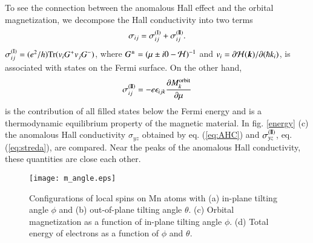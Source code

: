 \documentclass[letter,twocolumn,amsmath,amssymb,superscriptaddress]{jpsj3}
\newcommand{\vM}{\bm{M}}
\newcommand{\vk}{\bm{k}}
\begin{document}
To see the connection between the anomalous Hall effect and the orbital magnetization,
we decompose the Hall conductivity into two terms\cite{Streda1982}
\begin{equation}
\sigma_{ij}=
 \sigma_{ij}^{\rm (I)} + \sigma_{ij}^{\rm (I\!I)}.
\label{eq:I+II}
\end{equation}
$\sigma_{ij}^{\rm (I)}=(e^2/h){\rm Tr}(v_iG^+v_jG^-)$, 
where $G^{\pm}=(\mu \pm i0-{\cal H})^{-1}$ and $v_i=\partial{\cal H}(\vk)/\partial(\hbar k_i)$, 
is associated with states on the Fermi surface.\cite{Streda1982} On the other hand, 
\begin{equation}
\sigma_{ij}^{\rm (I\!I)}
=-e \epsilon_{ijk} \frac{\partial M^{\rm orbit}_k}{\partial \mu}
\label{eq:streda}
\end{equation}
is the contribution of all filled states below the Fermi energy and is a thermodynamic equilibrium property of the magnetic material.\cite{Streda1982}
In fig. \ref{energy} (c) the anomalous Hall conductivity $\sigma_{yz}$ obtained by eq. (\ref{eq:AHC}) and $\sigma_{yz}^{\rm (I\!I)}$, eq.(\ref{eq:streda}), are compared. Near the peaks of the anomalous Hall conductivity, these quantities are close each other.





\begin{figure}[t]
 \leavevmode\texttt{[image: m\_angle.eps]} %
 \caption{
 Configurations of local spins on Mn atoms with (a) in-plane tilting angle $\phi$ and (b) out-of-plane tilting angle $\theta$.
 (c) Orbital magnetization as a function of in-plane tilting angle $\phi$. (d) Total energy of electrons as a function of $\phi$ and $\theta$.
 }
 \label{angle}
\end{figure}



\end{document}
